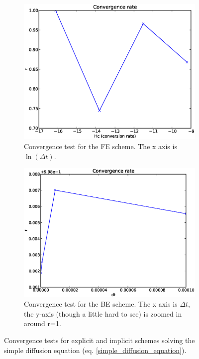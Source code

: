 \begin{figure}[H]
 \centering
 \begin{subfigure}[b]{0.48\textwidth}
 \includegraphics[width=\textwidth]{../doc/results/experiment_27112013_1017/results/ConvergenceTest.eps}
 \caption{Convergence test for the FE scheme. The x axis is $\ln(\Delta t)$.}
 \label{convergence_test:FE}
\end{subfigure}
\begin{subfigure}[b]{0.48\textwidth}
 \includegraphics[width=\textwidth]{../doc/results/experiment_13012014_0925_Simple1DConvergenceTestBE/results/ConvergenceTest.eps}
 \caption{Convergence test for the BE scheme. The x axis is $\Delta t$, the y-axis (though a little hard to see) is zoomed in around r=1.}
 \label{convergence_test:BE}
\end{subfigure}
\caption{Convergence tests for explicit and implicit schemes solving the simple diffusion equation (eq. \eqref{simple_diffusion_equation}).}
\label{convergence_test}
\end{figure}

